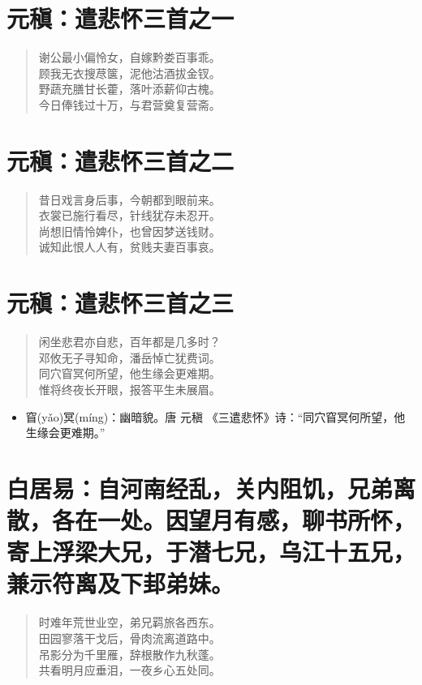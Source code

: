 \documentclass[12pt,oneside]{book}
\newenvironment{shici}{%
\begin{verse}\centering\yanti\large\hspace{12pt}}{\end{verse}}
\begin{document}
\begin{common-format}
\chapter{元稹：遣悲怀三首之一}
\begin{shici}
谢公最小偏怜女，自嫁黔娄百事乖。\\
顾我无衣搜荩箧，泥他沽酒拔金钗。\\
野蔬充膳甘长藿，落叶添薪仰古槐。\\
今日俸钱过十万，与君营奠复营斋。
\end{shici}

\chapter{元稹：遣悲怀三首之二}
\begin{shici}
昔日戏言身后事，今朝都到眼前来。\\
衣裳已施行看尽，针线犹存未忍开。\\
尚想旧情怜婢仆，也曾因梦送钱财。\\
诚知此恨人人有，贫贱夫妻百事哀。
\end{shici}

\chapter{元稹：遣悲怀三首之三}
\begin{shici}
闲坐悲君亦自悲，百年都是几多时？\\
邓攸无子寻知命，潘岳悼亡犹费词。\\
同穴窅冥何所望，他生缘会更难期。\\
惟将终夜长开眼，报答平生未展眉。
\end{shici}

\begin{itemize}
\item 窅(yǎo)冥(míng)：幽暗貌。唐 元稹 《三遣悲怀》诗：“同穴窅冥何所望，他生缘会更难期。”
\end{itemize}

\chapter{白居易：自河南经乱，关内阻饥，兄弟离散，各在一处。因望月有感，聊书所怀，寄上浮梁大兄，于潜七兄，乌江十五兄，兼示符离及下邽弟妹。}
\begin{shici}
时难年荒世业空，弟兄羁旅各西东。\\
田园寥落干戈后，骨肉流离道路中。\\
吊影分为千里雁，辞根散作九秋蓬。\\
共看明月应垂泪，一夜乡心五处同。
\end{shici}


\end{common-format}
\end{document}
